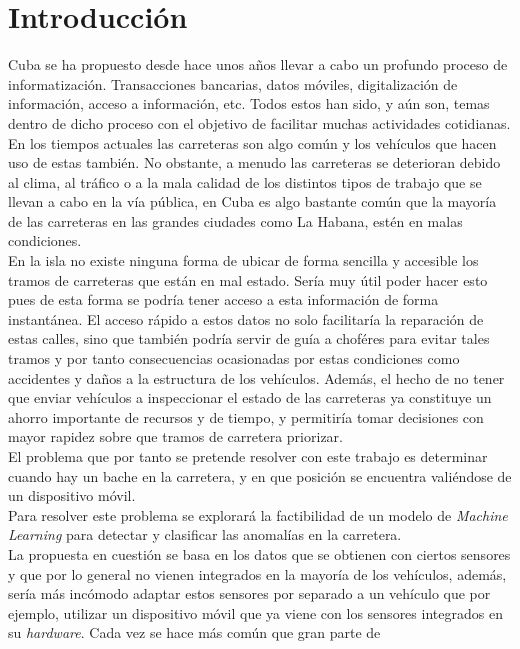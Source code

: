 \chapter*{Introducción}\label{chapter:introduction}

Cuba se ha propuesto desde hace unos años llevar a cabo un profundo proceso de informatización.
Transacciones bancarias, datos móviles, digitalización de información, acceso a información, etc. Todos
estos han sido, y aún son, temas dentro de dicho proceso con el objetivo de facilitar muchas actividades
cotidianas. En los tiempos actuales las carreteras son algo común y los vehículos que hacen uso de estas
también. No obstante, a menudo las carreteras se deterioran debido al clima, al tráfico o a la mala calidad 
de los distintos tipos de trabajo que se llevan a cabo en la vía pública, en Cuba es algo bastante común que
la mayoría de las carreteras en las grandes ciudades como La Habana, estén en malas condiciones.\\
\indent En la isla no existe ninguna forma de ubicar de forma sencilla y accesible los tramos de carreteras que están en
mal estado. Sería muy útil poder hacer esto pues de esta forma se podría tener acceso a esta información de forma
instantánea. El acceso rápido a estos datos no solo facilitaría la reparación de estas calles, sino que también
podría servir de guía a choféres para evitar tales tramos y por tanto consecuencias ocasionadas por estas condiciones
como accidentes y daños a la estructura de los vehículos. Además, el hecho de no tener que enviar vehículos a
inspeccionar el estado de las carreteras ya constituye un ahorro importante de recursos y de tiempo, y permitiría
tomar decisiones con mayor rapidez sobre que tramos de carretera priorizar.\\
\indent El problema que por tanto se pretende resolver con este trabajo es determinar cuando hay un bache en la carretera, y en que
posición se encuentra valiéndose de un dispositivo móvil.\\
\indent Para resolver este problema se explorará la factibilidad de un modelo de \emph{Machine Learning} para detectar y clasificar
las anomalías en la carretera.\\
\indent La propuesta en cuestión se basa en los datos que se obtienen con ciertos sensores y que por lo general no vienen integrados
en la mayoría de los vehículos, además, sería más incómodo adaptar estos sensores por separado a un vehículo que por ejemplo, utilizar
un dispositivo móvil que ya viene con los sensores integrados en su \emph{hardware}. Cada vez se hace más común que  gran parte de 
